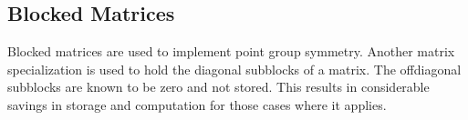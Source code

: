 \subsection{Blocked Matrices}

Blocked matrices are used to implement point group symmetry.  Another
matrix specialization is used to hold the diagonal subblocks of a
matrix.  The offdiagonal subblocks are known to be zero and not stored.
This results in considerable savings in storage and computation for
those cases where it applies.

\addtocounter{clsheadingnum}{-1}
\addtocounter{clssubheadingnum}{-1}
